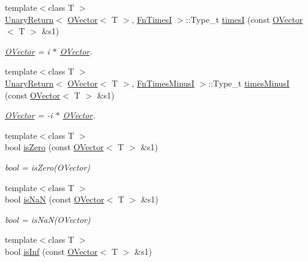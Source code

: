 \begin{DoxyCompactItemize}
{\footnotesize template$<$class T $>$ }\\\mbox{\hyperlink{structENSEM_1_1UnaryReturn}{Unary\+Return}}$<$ \mbox{\hyperlink{classENSEM_1_1OVector}{O\+Vector}}$<$ T $>$, \mbox{\hyperlink{structENSEM_1_1FnTimesI}{Fn\+TimesI}} $>$\+::Type\+\_\+t \mbox{\hyperlink{group__obsvector_gae21f93a0579f899ea525fd69333d5381}{timesI}} (const \mbox{\hyperlink{classENSEM_1_1OVector}{O\+Vector}}$<$ T $>$ \&s1)
\begin{DoxyCompactList}\small\item\em \mbox{\hyperlink{classENSEM_1_1OVector}{O\+Vector}} = i $\ast$ \mbox{\hyperlink{classENSEM_1_1OVector}{O\+Vector}}. \end{DoxyCompactList}\item 
{\footnotesize template$<$class T $>$ }\\\mbox{\hyperlink{structENSEM_1_1UnaryReturn}{Unary\+Return}}$<$ \mbox{\hyperlink{classENSEM_1_1OVector}{O\+Vector}}$<$ T $>$, \mbox{\hyperlink{structENSEM_1_1FnTimesMinusI}{Fn\+Times\+MinusI}} $>$\+::Type\+\_\+t \mbox{\hyperlink{group__obsvector_ga54c8e8c422afecbe2b647d021d931efb}{times\+MinusI}} (const \mbox{\hyperlink{classENSEM_1_1OVector}{O\+Vector}}$<$ T $>$ \&s1)
\begin{DoxyCompactList}\small\item\em \mbox{\hyperlink{classENSEM_1_1OVector}{O\+Vector}} = -\/i $\ast$ \mbox{\hyperlink{classENSEM_1_1OVector}{O\+Vector}}. \end{DoxyCompactList}\item 
{\footnotesize template$<$class T $>$ }\\bool \mbox{\hyperlink{group__obsvector_gaba334c166dc76f5d8390574d1ea1a936}{is\+Zero}} (const \mbox{\hyperlink{classENSEM_1_1OVector}{O\+Vector}}$<$ T $>$ \&s1)
\begin{DoxyCompactList}\small\item\em bool = is\+Zero(\+O\+Vector) \end{DoxyCompactList}\item 
{\footnotesize template$<$class T $>$ }\\bool \mbox{\hyperlink{group__obsvector_ga2f554e602e9adc3c7d908a9f9518af6e}{is\+NaN}} (const \mbox{\hyperlink{classENSEM_1_1OVector}{O\+Vector}}$<$ T $>$ \&s1)
\begin{DoxyCompactList}\small\item\em bool = is\+Na\+N(\+O\+Vector) \end{DoxyCompactList}\item 
{\footnotesize template$<$class T $>$ }\\bool \mbox{\hyperlink{group__obsvector_ga4faba5244cb224511d1944e1cc99b2db}{is\+Inf}} (const \mbox{\hyperlink{classENSEM_1_1OVector}{O\+Vector}}$<$ T $>$ \&s1)

\end{DoxyCompactItemize}
